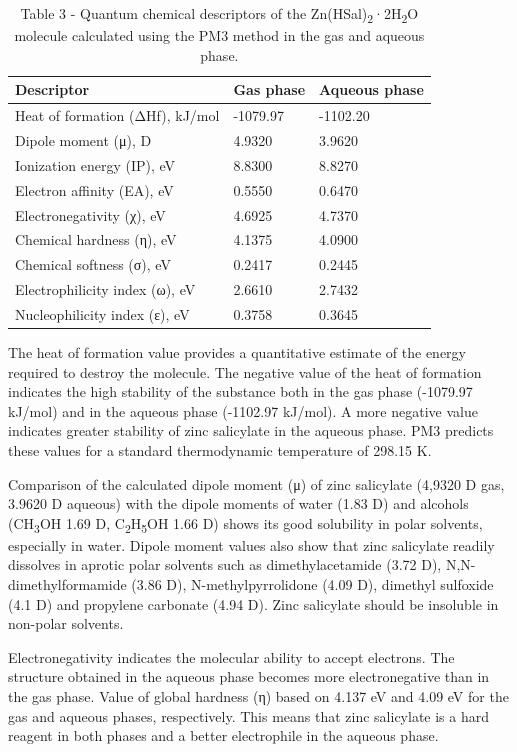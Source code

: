 \begin{table}[H]
\caption*{Table 3 - Quantum chemical descriptors of the Zn(HSal)\textsubscript{2}·2H\textsubscript{2}O molecule calculated using the PM3 method in the gas and aqueous phase.}
\centering
\begin{tabular}{|l|l|l|}
\hline
Descriptor & Gas phase & Aqueous phase \\ \hline
Heat of formation (ΔHf), kJ/mol & -1079.97 & -1102.20 \\ \hline
Dipole moment (μ), D & 4.9320 & 3.9620 \\ \hline
Ionization energy (IP), eV & 8.8300 & 8.8270 \\ \hline
Electron affinity (EA), eV & 0.5550 & 0.6470 \\ \hline
Electronegativity (χ), eV & 4.6925 & 4.7370 \\ \hline
Chemical hardness (η), eV & 4.1375 & 4.0900 \\ \hline
Chemical softness (σ), eV & 0.2417 & 0.2445 \\ \hline
Electrophilicity index (ω), eV & 2.6610 & 2.7432 \\ \hline
Nucleophilicity index (ε), eV & 0.3758 & 0.3645 \\ \hline
\end{tabular}
\end{table}

The heat of formation value provides a quantitative estimate of the
energy required to destroy the molecule. The negative value of the heat
of formation indicates the high stability of the substance both in the
gas phase (-1079.97 kJ/mol) and in the aqueous phase (-1102.97 kJ/mol).
A more negative value indicates greater stability of zinc salicylate in
the aqueous phase. PM3 predicts these values for a standard
thermodynamic temperature of 298.15 K.

Comparison of the calculated dipole moment (μ) of zinc salicylate
(4,9320 D gas, 3.9620 D aqueous) with the dipole moments of water (1.83
D) and alcohols (CH\textsubscript{3}OH 1.69 D,
C\textsubscript{2}H\textsubscript{5}OH 1.66 D) shows its good solubility
in polar solvents, especially in water. Dipole moment values also show
that zinc salicylate readily dissolves in aprotic polar solvents such as
dimethylacetamide (3.72 D), N,N-dimethylformamide (3.86 D),
N-methylpyrrolidone (4.09 D), dimethyl sulfoxide (4.1 D) and propylene
carbonate (4.94 D). Zinc salicylate should be insoluble in non-polar
solvents.

Electronegativity indicates the molecular ability to accept electrons.
The structure obtained in the aqueous phase becomes more electronegative
than in the gas phase. Value of global hardness (η) based on 4.137 eV
and 4.09 eV for the gas and aqueous phases, respectively. This means
that zinc salicylate is a hard reagent in both phases and a better
electrophile in the aqueous phase.

